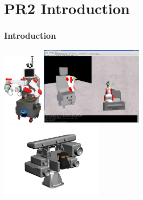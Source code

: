 \section{PR2 Introduction}
\begin{frame}
  \frametitle{Introduction}
\includegraphics[width=2cm]{img/taser.jpg}
\hspace{5ex}
\includegraphics[width=5cm]{img/TASER_simulator1.png} \\[0cm]
\vspace{-6ex}
\hspace{33ex}\includegraphics[width=5cm]{img/ActivePerceptionStereoHead_Top_Front.png}
\end{frame}


